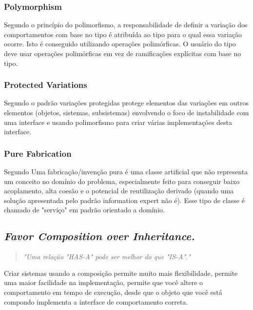 \documentclass[12pt]{article}
\begin{document}
\subsubsection{Polymorphism} \label{sec:grasp}

Segundo \cite{CRAIG_LARMAN} o princípio do polimorfismo, a responsabilidade de definir a variação dos comportamentos com base no tipo é atribuída ao tipo para o qual essa variação ocorre. Isto é conseguido utilizando operações polimórficas. O usuário do tipo deve usar operações polimórficas em vez de ramificações explícitas com base no tipo.


\subsubsection{Protected Variations} \label{sec:grasp}

Segundo \cite{CRAIG_LARMAN} o padrão variações protegidas protege elementos das variações em outros elementos (objetos, sistemas, subsistemas) envolvendo o foco de instabilidade com uma interface e usando polimorfismo para criar várias implementações desta interface.

\subsubsection{Pure Fabrication} \label{sec:grasp}

Segundo \cite{CRAIG_LARMAN} Uma fabricação/invenção pura é uma classe artificial que não representa um conceito no domínio do problema, especialmente feito para conseguir baixo acoplamento, alta coesão e o potencial de reutilização derivado (quando uma solução apresentada pelo padrão information expert não é). Esse tipo de classe é chamado de "serviço" em padrão orientado a domínio.


\subsection{\textit{Favor Composition over Inheritance.}} \label{sec:favor_composition}
\begin{quote}
\textit{"Uma relação "HAS-A" pode ser melhor do que "IS-A"."}\cite{HEADFIRST_DESIGN_PATTERN}
\end{quote}

Criar sistemas usando a composição permite muito mais flexibilidade, permite uma maior facilidade na implementação, permite que você altere o comportamento em tempo de execução, desde que o objeto que você está compondo implementa a interface de comportamento correta. 
\end{document}
